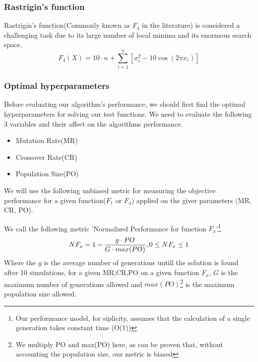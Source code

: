 \documentclass[openany]{article}
\begin{document}
			\subsubsection{Rastrigin's function}
				Rastrigin’s function(Commonly known as $F_{4}$ in the literature\cite{performance}) is considered a challenging task due to its large number of local minima and its enormous search space.
				\begin{equation}
				F_4(X)=10\cdot n+\sum_{i=1}^{n}[x_{i}^{2}-10\cos(2\pi x_{i})]
				\end{equation}
			\subsubsection{Optimal hyperparameters}
				Before evaluating our algorithm's performance, we should first find the optimal hyperparameters for solving our test functions.
				We need to evaluate the following 3 variables and their affect on the algorithms performance.
				\begin{itemize}
					\item Mutation Rate(MR)
					\item Crossover Rate(CR)
					\item Population Size(PO)
				\end{itemize}
				We will use the following unbiased metric for measuring the objective performance for a given function($F_1$ or $F_4$) applied on the giver parameters (MR, CR, PO).
				\pagebreak
				\begin{definition}
					We call the following metric 'Normalized Performance for function $F_{x}$'\footnote{Our performance model, for siplicity, assumes that the calculation of a single generation takes constant time (O(1))}
					\begin{equation}
						NF_{x}=1-\frac{g\cdot PO}{G\cdot max(PO)},\space 0\le NF_{x}\le 1
					\end{equation}
					Where the $g$ is the average number of generations untill the solution is found after 10 simulations, for a given MR,CR,PO on a given function $F_{x}$, $G$ is
					the maximum number of generations allowed and $max(PO)$\footnote{We multiply PO and max(PO) here, as can be proven that, without accounting the population size, our metric is biased} is the maximum population size allowed.
				\end{definition}
\end{document}
